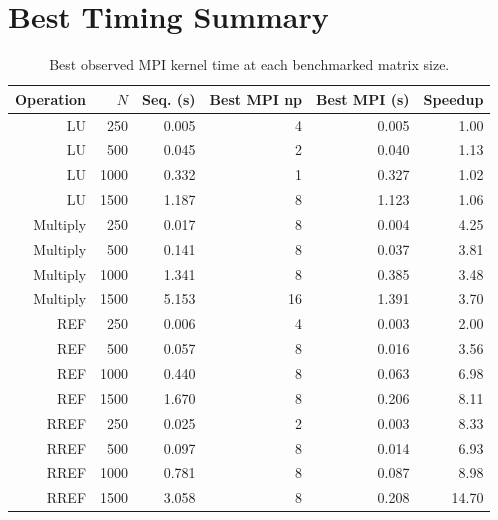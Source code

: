 \documentclass[11pt]{article}
\begin{document}
\section{Best Timing Summary}
\begin{table}[H]
\centering
\small
\begin{tabular}{rrrrrr}
\toprule
Operation & $N$ & Seq. (s) & Best MPI np & Best MPI (s) & Speedup \\
\midrule
LU & 250 & 0.005 & 4 & 0.005 & 1.00 \\
LU & 500 & 0.045 & 2 & 0.040 & 1.13 \\
LU & 1000 & 0.332 & 1 & 0.327 & 1.02 \\
LU & 1500 & 1.187 & 8 & 1.123 & 1.06 \\
Multiply & 250 & 0.017 & 8 & 0.004 & 4.25 \\
Multiply & 500 & 0.141 & 8 & 0.037 & 3.81 \\
Multiply & 1000 & 1.341 & 8 & 0.385 & 3.48 \\
Multiply & 1500 & 5.153 & 16 & 1.391 & 3.70 \\
REF & 250 & 0.006 & 4 & 0.003 & 2.00 \\
REF & 500 & 0.057 & 8 & 0.016 & 3.56 \\
REF & 1000 & 0.440 & 8 & 0.063 & 6.98 \\
REF & 1500 & 1.670 & 8 & 0.206 & 8.11 \\
RREF & 250 & 0.025 & 2 & 0.003 & 8.33 \\
RREF & 500 & 0.097 & 8 & 0.014 & 6.93 \\
RREF & 1000 & 0.781 & 8 & 0.087 & 8.98 \\
RREF & 1500 & 3.058 & 8 & 0.208 & 14.70 \\
\bottomrule
\end{tabular}
\caption{Best observed MPI kernel time at each benchmarked matrix size.}
\end{table}
\end{document}

